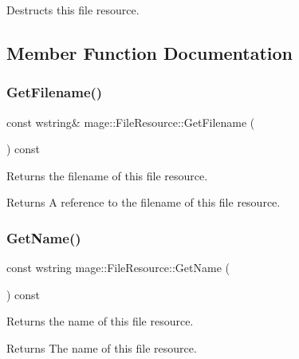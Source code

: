 Destructs this file resource. 

\subsection{Member Function Documentation}
\hypertarget{classmage_1_1_file_resource_a5930e472973b3e0d9b09dc9d031bacf1}{}\label{classmage_1_1_file_resource_a5930e472973b3e0d9b09dc9d031bacf1} 
\subsubsection{\texorpdfstring{Get\+Filename()}{GetFilename()}}
{\footnotesize\ttfamily const wstring\& mage\+::\+File\+Resource\+::\+Get\+Filename (\begin{DoxyParamCaption}{ }\end{DoxyParamCaption}) const}

Returns the filename of this file resource.

\begin{DoxyReturn}{Returns}
A reference to the filename of this file resource. 
\end{DoxyReturn}
\hypertarget{classmage_1_1_file_resource_a8bc3308e018b352157bbcfe3a85519f9}{}\label{classmage_1_1_file_resource_a8bc3308e018b352157bbcfe3a85519f9} 
\subsubsection{\texorpdfstring{Get\+Name()}{GetName()}}
{\footnotesize\ttfamily const wstring mage\+::\+File\+Resource\+::\+Get\+Name (\begin{DoxyParamCaption}{ }\end{DoxyParamCaption}) const}

Returns the name of this file resource.

\begin{DoxyReturn}{Returns}
The name of this file resource. 
\end{DoxyReturn}
\hypertarget{classmage_1_1_file_resource_a6dd2da5d50dbe8b3ac4189cdaa5fc325}{}\label{classmage_1_1_file_resource_a6dd2da5d50dbe8b3ac4189cdaa5fc325} 
